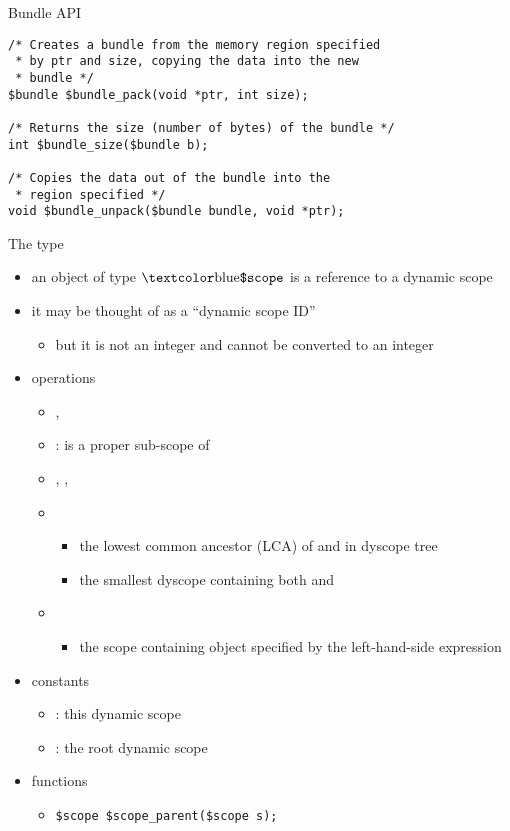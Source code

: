 \documentclass[t]{beamer}
\begin{document}
\begin{frame}[containsverbatim]{Bundle API}
\begin{verbatim}
/* Creates a bundle from the memory region specified
 * by ptr and size, copying the data into the new
 * bundle */
$bundle $bundle_pack(void *ptr, int size);

/* Returns the size (number of bytes) of the bundle */
int $bundle_size($bundle b);

/* Copies the data out of the bundle into the
 * region specified */
void $bundle_unpack($bundle bundle, void *ptr);
\end{verbatim}
\end{frame}

\begin{frame}[containsverbatim]{The \cscope{} type}
  \begin{itemize}
  \item an object of type $\cscope$ is a reference to a dynamic scope
  \item it may be thought of as a ``dynamic scope ID''
    \begin{itemize}
    \item but it is not an integer and cannot be converted to an
      integer
    \end{itemize}
  \item operations
    \begin{itemize}
    \item \code{==}, \code{!=}
    \item {} :  is a proper sub-scope of 
    \item \code{<=}, \code{>}, \code{>=}
    \item {}
      \begin{itemize}
      \item the lowest common ancestor (LCA) of  and 
        in dyscope tree
      \item the smallest dyscope containing both  and 
      \end{itemize}
    \item {}
      \begin{itemize}
      \item the scope containing object specified by the
        left-hand-side expression
      \end{itemize}
    \end{itemize}
  \item constants
    \begin{itemize}
    \item \chere: this dynamic scope
    \item \cscoperoot: the root dynamic scope
    \end{itemize}
  \item functions
    \begin{itemize}
    \item \verb!$scope $scope_parent($scope s);!
    \end{itemize}
  \end{itemize}
\end{frame}
\end{document}
